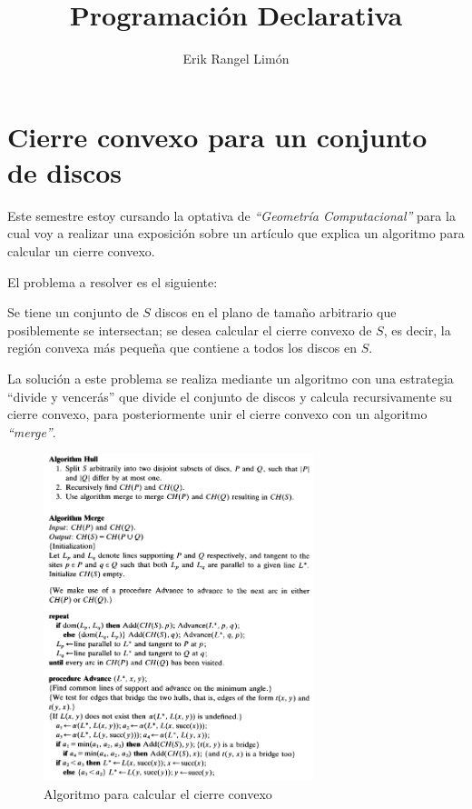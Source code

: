 \documentclass[12pt]{article}
\title{Programación Declarativa}
\author{Erik Rangel Limón}
\begin{document}

\maketitle

\section*{Cierre convexo para un conjunto de discos}

\noindent Este semestre estoy cursando la optativa de \textit{``Geometría Computacional''} para la cual voy a realizar una exposición sobre un artículo que explica un algoritmo para calcular un cierre convexo.

\medskip

El problema a resolver es el siguiente:

Se tiene un conjunto de $S$ discos en el plano de tamaño arbitrario que posiblemente se intersectan; se desea calcular el cierre convexo de $S$, es decir, la región convexa más pequeña que contiene a todos los discos en $S$.

La solución a este problema se realiza mediante un algoritmo con una estrategia ``divide y vencerás'' que divide el conjunto de discos y calcula recursivamente su cierre convexo, para posteriormente unir el cierre convexo con un algoritmo \textit{``merge''}.

\begin{figure}[h!]
  \centering
  \includegraphics[width=0.7\textwidth]{hull.png}
  \caption{Algoritmo para calcular el cierre convexo}
\end{figure}
\end{document}
